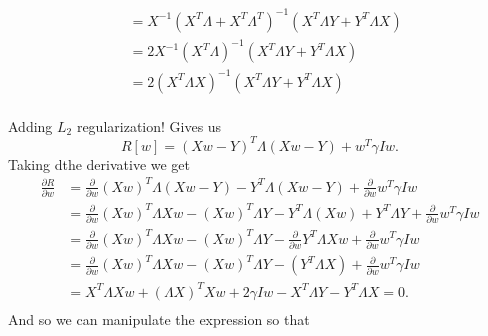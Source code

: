 \documentclass[letter]{article}
\newenvironment{menumerate}{%
  \edef\backupindent{\the\parindent}%
  \enumerate%
  \setlength{\parindent}{\backupindent}%
}{\endenumerate}
\begin{document}
\begin{menumerate}
\begin{menumerate}
\begin{equation}
\begin{aligned}
          &=  X^{-1}(X^T \Lambda  + X^T\Lambda^T )^{-1}(X^T \Lambda Y  + Y^T\Lambda X) \\
          &=  2X^{-1}(X^T\Lambda)^{-1}(X^T \Lambda Y  + Y^T\Lambda X) \\
          &=  2(X^T\Lambda X)^{-1}(X^T \Lambda Y  + Y^T\Lambda X) \\
      \end{aligned}
    \end{equation}
    \item Adding $L_2$ regularization! Gives us
    \begin{equation}
      R[w] = (Xw - Y)^T\Lambda (Xw - Y) +  w^T\gamma I w.
    \end{equation}
    Taking dthe derivative we get
    \begin{equation}
      \begin{aligned}
        \frac{\partial R}{\partial w} &= \frac{\partial}{\partial w} (Xw)^T\Lambda (Xw - Y) - Y^T\Lambda (Xw - Y) +   \frac{\partial }{\partial w}w^T\gamma I w\\
         &= \frac{\partial}{\partial w} (Xw)^T\Lambda Xw - (Xw)^T\Lambda Y - Y^T\Lambda (Xw) + Y^T \Lambda Y  + \frac{\partial }{\partial w}w^T\gamma I w \\
         &= \frac{\partial}{\partial w} (Xw)^T\Lambda Xw - (Xw)^T\Lambda Y- \frac{\partial}{\partial w}  Y^T\Lambda Xw  +\frac{\partial }{\partial w}w^T\gamma I w\\
         &= \frac{\partial}{\partial w} (Xw)^T\Lambda Xw - (Xw)^T\Lambda Y - (Y^T\Lambda X)  + \frac{\partial }{\partial w}w^T\gamma I w\\
         &= X^T \Lambda Xw + (\Lambda X)^T Xw + 2\gamma I w - X^T \Lambda Y  - Y^T\Lambda X = 0. \\
      \end{aligned}
    \end{equation}
    And so we can manipulate the expression so that
    

\end{menumerate}
\end{menumerate}
\end{document}
